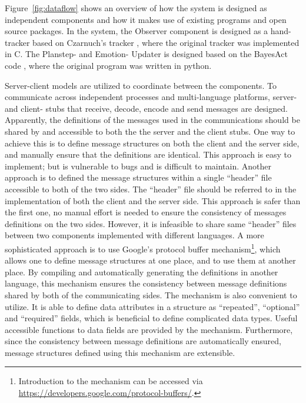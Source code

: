 Figure~\ref{fig:dataflow} shows an overview of how the system is designed as independent components and how it makes use of existing programs and open source packages. In the system, the Observer component is designed as a hand-tracker based on Czarnuch's tracker \cite{czarnuch2014}, where the original tracker was implemented in C. The Planstep- and Emotion- Updater is designed based on the BayesAct code \cite{hoey2013bayesian}, where the original program was written in python.

Server-client models are utilized to coordinate between the components. To communicate across independent processes and multi-language platforms, server- and client- stubs that receive, decode, encode and send messages are designed. Apparently, the definitions of the messages used in the communications should be shared by and accessible to both the  the server and the client stubs. One way to achieve this is to define message structures on both the client and the server side, and manually ensure that the definitions are identical. This approach is easy to implement; but is vulnerable to bugs and is difficult to maintain. Another approach is to defined the message structures within a single ``header'' file accessible to both of the two sides. The ``header'' file should be referred to in the implementation of both the client and the server side. This approach is safer than the first one, no manual effort is needed to ensure the consistency of messages definitions on the two sides. However, it is infeasible to share same ``header'' files between two components implemented with different languages. A more sophisticated approach is to use Google's protocol buffer mechanism\footnote{Introduction to the mechanism can be accessed via \url{https://developers.google.com/protocol-buffers/}.}, which allows one to define message structures at one place, and to use them at another place. By compiling and automatically generating the definitions in another language, this mechanism ensures the consistency between message definitions shared by both of the communicating sides. The mechanism is also convenient to utilize. It is able to define data attributes in a structure as ``repeated'', ``optional'' and ``required'' fields, which is beneficial to define complicated data types. Useful accessible functions to data fields are provided by the mechanism. Furthermore, since the consistency between message definitions are automatically ensured, message structures defined using this mechanism are extensible.

